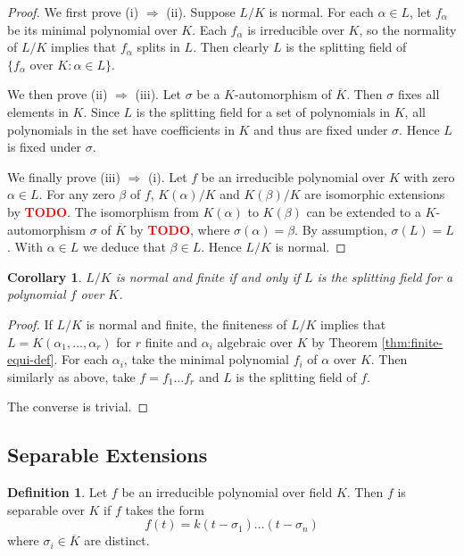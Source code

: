 \documentclass[12pt]{article}
\newtheorem{corollary}[theorem]{Corollary}
\theoremstyle{definition}
\newtheorem{definition}[theorem]{Definition}
\newcommand{\TODO}{\textbf{\textcolor{red}{TODO}}}
\begin{document}
\begin{proof}
    We first prove (i) $\Rightarrow$ (ii). 
    Suppose $L/K$ is normal. 
    For each $\alpha \in L$, let $f_\alpha$ be its minimal polynomial over $K$. Each $f_\alpha$ is irreducible over $K$, so the normality of $L/K$ implies that $f_\alpha$ splits in $L$. Then clearly $L$ is the splitting field of $\{ f_\alpha \text{ over } K : \alpha \in L \}$. 

    We then prove (ii) $\Rightarrow$ (iii). Let $\sigma$ be a $K$-automorphism of $\overline K$. Then $\sigma$ fixes all elements in $K$. Since $L$ is the splitting field for a set of polynomials in $K$, all polynomials in the set have coefficients in $K$ and thus are fixed under $\sigma$. Hence $L$ is fixed under $\sigma$. 

    We finally prove (iii) $\Rightarrow$ (i). Let $f$ be an irreducible polynomial over $K$ with zero $\alpha \in L$. For any zero $\beta$ of $f$, $K(\alpha)/K$ and $K(\beta)/K$ are isomorphic extensions by \TODO. The isomorphism from $K(\alpha)$ to $K(\beta)$ can be extended to a $K$-automorphism $\sigma$ of $\overline K$ by \TODO, where $\sigma(\alpha) = \beta$. By assumption, $\sigma(L) = L$. With $\alpha \in L$ we deduce that $\beta \in L$. Hence $L/K$ is normal.
\end{proof}

\begin{corollary}
    $L/K$ is normal and finite if and only if $L$ is the splitting field for a polynomial $f$ over $K$. 
\end{corollary}

\begin{proof}
    If $L/K$ is normal and finite, the finiteness of $L/K$ implies that $L = K(\alpha_1, \dots, \alpha_r)$ for $r$ finite and $\alpha_i$ algebraic over $K$ by Theorem \ref{thm:finite-equi-def}. For each $\alpha_i$, take the minimal polynomial $f_i$ of $\alpha$ over $K$. Then similarly as above, take $f = f_1 \dots f_r$ and $L$ is the splitting field of $f$.

    The converse is trivial.
\end{proof}


\subsection{Separable Extensions}

\begin{definition}
    Let $f$ be an irreducible polynomial over field $K$. Then $f$ is separable over $K$ if $f$ takes the form 
    $$
        f(t) = k(t - \sigma_1) \dots (t - \sigma_n)
    $$
    where $\sigma_i \in \overline K$ are distinct.
\end{definition}
\end{document}
